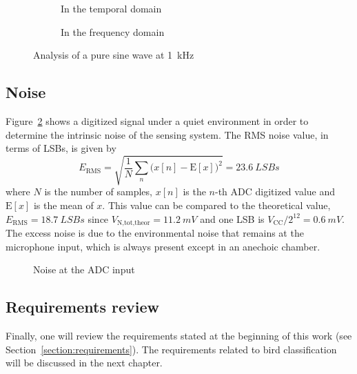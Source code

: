 \documentclass{EPL-master-thesis-covers-EN}
\newcommand{\te}[1]{\textrm{#1}}
\begin{document}
\begin{figure}[H]
\begin{subfigure}{.5\textwidth}
  \centering
  
  \caption{In the temporal domain}
\end{subfigure}
\begin{subfigure}{.48\textwidth}
  \centering
  
  \caption{In the frequency domain}
\end{subfigure}
\caption{Analysis of a pure sine wave at \SI{1}{kHz}}
\label{fig:sine_sound}
\end{figure}


\subsection*{Noise}

Figure~\ref{fig:noise_sound} shows a digitized signal under a quiet environment in order to determine the intrinsic noise of the sensing system. The RMS noise value, in terms of LSBs, is given by
\[
 E_\te{RMS} = \sqrt{\frac{1}{N}\sum_n{\big(x[n]-\te{E}[x]\big)^2}} = \SI{23.6}{LSBs}
\]
where $N$ is the number of samples, $x[n]$ is the $n$-th ADC digitized value and $\te{E}[x]$ is the mean of $x$. This value can be compared to the theoretical value, $E_\te{RMS} = \SI{18.7}{LSBs}$ since $V_\te{N,tot,theor} = \SI{11.2}{mV}$ and one LSB is $V_\te{CC} / 2^{12} = \SI{0.6}{mV}$. The excess noise is due to the environmental noise that remains at the microphone input, which is always present except in an anechoic chamber.

\begin{figure}[H]
    \centering
    
    \caption{Noise at the ADC input}
    \label{fig:noise_sound}
\end{figure}




    
\subsection*{Requirements review}

Finally, one will review the requirements stated at the beginning of this work (see Section~\ref{section:requirements}). The requirements related to bird classification will be discussed in the next chapter.
\end{document}
